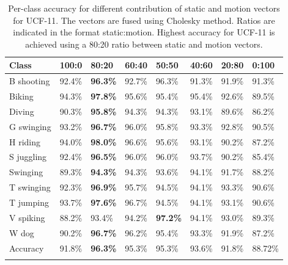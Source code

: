\begin{table*}[]
\centering

\label{my-label}
\begin{tabular}{|l||l|l|l|l|l|l|l|}
\hline
Class           & 100:0  & 80:20     & 60:40   & 50:50    & 40:60     & 20:80   & 0:100 \\ \hline  \hline
B shooting      & 92.4\% & \textbf{96.3\%}   & 92.7\%  &  96.3\%  &  91.3\%   & 91.9\%  & 91.3\%  \\ 
Biking          & 94.3\% &  \textbf{97.8\%}   & 95.6\%  &  95.4\%  &  95.4\%   & 92.6\%  & 89.5\%   \\ 
Diving          & 90.3\% &  \textbf{95.8\%}   & 94.3\%  &  94.3\%  &  93.1\%   &  89.6\% & 86.2\%  \\ 
G swinging      & 93.2\% & \textbf{96.7\%}   &  96.0\% &  95.8\%  &  93.3\%   &  92.8\% & 90.5\% \\ 
H riding        & 94.0\% &  \textbf{98.0\%}   &  96.6\% &  95.6\%  &  93.1\%   &  90.2\% & 87.2\% \\ 
S juggling      & 92.4\%&  \textbf{96.5\%}    & 96.0\%  &  96.0\%  &  93.7\%   &  90.2\% & 85.4\%  \\ 
Swinging        & 89.3\%&  \textbf{94.3\%}    & 94.3\%  &  93.6\%  &  94.1\%   &  91.7\% & 88.2\% \\ 
T swinging      & 92.3\%& \textbf{96.9\% }    &  95.7\% &  94.5\%  &  94.1\%   &  93.3\% &  90.6\% \\ 
T jumping       & 93.7\%&  \textbf{97.6\%}    &  96.7\% &  94.5\%  &  94.1\%   &  93.1\% & 90.6\% \\ 
V spiking       & 88.2\%&  93.4\%    &  94.2\% &  \textbf{97.2\%}  &  94.1\%   &  93.0\% & 89.3\% \\ 
W dog           & 90.2\%&  \textbf{96.7\% }   &   96.2\%&  95.4\%  &  93.3\%   &  91.9\% & 87.2\% \\  \hline
Accuracy        &   91.8\%&  \textbf{96.3\%}    &   95.3\%&  95.3\%  &  93.6\%   & 91.8\%  & 88.72\%  \\ \hline
\label{tbl:rho ucf}
\end{tabular}
\caption{Per-class accuracy for different contribution of static and motion vectors for UCF-11. The vectors are fused using Cholesky method. Ratios are indicated in the 
format static:motion. Highest accuracy for UCF-11 is achieved using a 
80:20 ratio between static and motion vectors.}
\end{table*}

